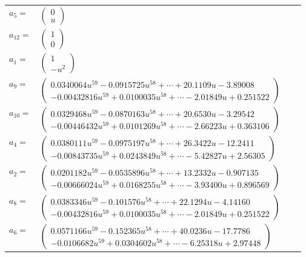 \documentclass[1p]{elsarticle_modified}
\theoremstyle{definition}
\begin{document}
\begin{tabular}{m{7pt} m{180pt} m{7pt} m{180pt} }
\flushright $a_{5}=$&$\begin{pmatrix}0\\u\end{pmatrix}$ \\
\flushright $a_{12}=$&$\begin{pmatrix}1\\0\end{pmatrix}$ \\
\flushright $a_{1}=$&$\begin{pmatrix}1\\- u^2\end{pmatrix}$ \\
\flushright $a_{9}=$&$\begin{pmatrix}0.0340064 u^{59}-0.0915725 u^{58}+\cdots+20.1109 u-3.89008\\-0.00432816 u^{59}+0.0100035 u^{58}+\cdots-2.01849 u+0.251522\end{pmatrix}$ \\
\flushright $a_{10}=$&$\begin{pmatrix}0.0329468 u^{59}-0.0870163 u^{58}+\cdots+20.6530 u-3.29542\\-0.00446432 u^{59}+0.0101269 u^{58}+\cdots-2.66223 u+0.363106\end{pmatrix}$ \\
\flushright $a_{4}=$&$\begin{pmatrix}0.0380111 u^{59}-0.0975197 u^{58}+\cdots+26.3422 u-12.2411\\-0.00843735 u^{59}+0.0243849 u^{58}+\cdots-5.42827 u+2.56305\end{pmatrix}$ \\
\flushright $a_{2}=$&$\begin{pmatrix}0.0201182 u^{59}-0.0535896 u^{58}+\cdots+13.2332 u-0.907135\\-0.00666024 u^{59}+0.0168255 u^{58}+\cdots-3.93400 u+0.896569\end{pmatrix}$ \\
\flushright $a_{8}=$&$\begin{pmatrix}0.0383346 u^{59}-0.101576 u^{58}+\cdots+22.1294 u-4.14160\\-0.00432816 u^{59}+0.0100035 u^{58}+\cdots-2.01849 u+0.251522\end{pmatrix}$ \\
\flushright $a_{6}=$&$\begin{pmatrix}0.0571166 u^{59}-0.152365 u^{58}+\cdots+40.0236 u-17.7786\\-0.0106682 u^{59}+0.0304602 u^{58}+\cdots-6.25318 u+2.97448\end{pmatrix}$ \\

\end{tabular}
\end{document}
